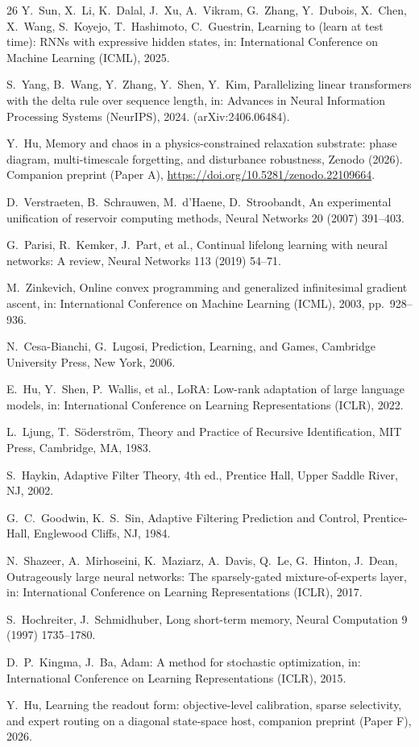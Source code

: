 \documentclass[preprint,12pt]{elsarticle}
\begin{document}
\begin{thebibliography}{26}
Y.~Sun, X.~Li, K.~Dalal, J.~Xu, A.~Vikram, G.~Zhang, Y.~Dubois,
X.~Chen, X.~Wang, S.~Koyejo, T.~Hashimoto, C.~Guestrin, Learning to
(learn at test time): RNNs with expressive hidden states, in:
International Conference on Machine Learning (ICML), 2025.

S.~Yang, B.~Wang, Y.~Zhang, Y.~Shen, Y.~Kim, Parallelizing linear
transformers with the delta rule over sequence length, in: Advances in
Neural Information Processing Systems (NeurIPS), 2024.
(arXiv:2406.06484).

Y.~Hu, Memory and chaos in a physics-constrained relaxation substrate:
phase diagram, multi-timescale forgetting, and disturbance robustness,
Zenodo (2026). Companion preprint (Paper A),
\url{https://doi.org/10.5281/zenodo.22109664}.

D.~Verstraeten, B.~Schrauwen, M.~d'Haene, D.~Stroobandt, An
experimental unification of reservoir computing methods, Neural
Networks 20 (2007) 391--403.

G.~Parisi, R.~Kemker, J.~Part, et al., Continual lifelong learning with
neural networks: A review, Neural Networks 113 (2019) 54--71.

M.~Zinkevich, Online convex programming and generalized infinitesimal
gradient ascent, in: International Conference on Machine Learning
(ICML), 2003, pp.~928--936.

N.~Cesa-Bianchi, G.~Lugosi, Prediction, Learning, and Games, Cambridge
University Press, New York, 2006.

E.~Hu, Y.~Shen, P.~Wallis, et al., LoRA: Low-rank adaptation of large
language models, in: International Conference on Learning
Representations (ICLR), 2022.

L.~Ljung, T.~S\"oderstr\"om, Theory and Practice of Recursive
Identification, MIT Press, Cambridge, MA, 1983.

S.~Haykin, Adaptive Filter Theory, 4th ed., Prentice Hall, Upper
Saddle River, NJ, 2002.

G.~C.~Goodwin, K.~S.~Sin, Adaptive Filtering Prediction and Control,
Prentice-Hall, Englewood Cliffs, NJ, 1984.

N.~Shazeer, A.~Mirhoseini, K.~Maziarz, A.~Davis, Q.~Le, G.~Hinton,
J.~Dean, Outrageously large neural networks: The sparsely-gated
mixture-of-experts layer, in: International Conference on Learning
Representations (ICLR), 2017.

S.~Hochreiter, J.~Schmidhuber, Long short-term memory, Neural
Computation 9 (1997) 1735--1780.

D.~P.~Kingma, J.~Ba, Adam: A method for stochastic optimization, in:
International Conference on Learning Representations (ICLR), 2015.

Y.~Hu, Learning the readout form: objective-level calibration, sparse
selectivity, and expert routing on a diagonal state-space host,
companion preprint (Paper F), 2026.

\end{thebibliography}
\endgroup
\end{document}
